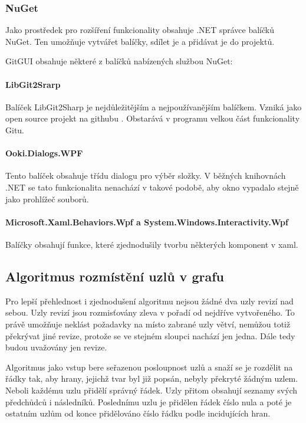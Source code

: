 \documentclass[
  biblatex,
  glossaries,
  index
]{kidiplom}
\begin{document}
\subsubsection{NuGet}
Jako prostředek pro rozšíření funkcionality obsahuje .NET správce balíčků NuGet. Ten umožňuje vytvářet balíčky, sdílet je a přidávat je do projektů.

GitGUI obsahuje některé z balíčků nabízených službou NuGet:

\paragraph*{LibGit2Srarp}
Balíček LibGit2Sharp je nejdůležitějším a nejpoužívanějším balíčkem. Vzniká jako open source projekt na githubu \citep{libgitreference}. Obstarává v programu velkou část funkcionality Gitu.

\paragraph*{Ooki.Dialogs.WPF}
Tento balíček obsahuje třídu dialogu pro výběr složky. V běžných knihovnách .NET se tato funkcionalita nenachází v takové podobě, aby okno vypadalo stejně jako prohlížeč souborů.

\paragraph*{Microsoft.Xaml.Behaviors.Wpf a System.Windows.Interactivity.Wpf}
Balíčky obsahují funkce, které zjednodušily tvorbu některých komponent v xaml.



\subsection{Algoritmus rozmístění uzlů v grafu}
\label{subsec:algorithm}
Pro lepší přehlednost i zjednodušení algoritmu nejsou žádné dva uzly revizí nad sebou. Uzly revizí jsou rozmisťovány zleva v pořadí od nejdříve vytvořeného. To právě umožňuje neklást požadavky na místo zabrané uzly větví, nemůžou totiž překrývat jiné revize, protože se ve stejném sloupci nachází jen jedna. Dále tedy budou uvažovány jen revize.

Algoritmus jako vstup bere seřazenou posloupnost uzlů a snaží se je rozdělit na řádky tak, aby hrany, jejichž tvar byl již popsán, nebyly překryté žádným uzlem. Neboli každému uzlu přidělí správný řádek. Uzly přitom obsahují seznamy svých předchůdců i následníků. Poslednímu uzlu je přidělen řádek číslo nula a poté je ostatním uzlům od konce přidělováno číslo řádku podle incidujících hran.
\end{document}

